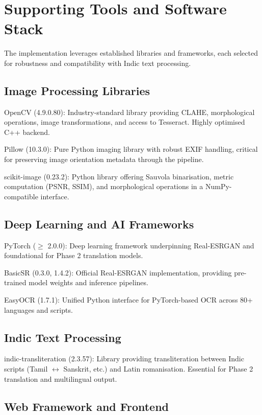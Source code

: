 \section{Supporting Tools and Software Stack}

The implementation leverages established libraries and frameworks, each selected for robustness and compatibility with Indic text processing.

\subsection{Image Processing Libraries}

OpenCV (4.9.0.80): Industry-standard library providing CLAHE, morphological operations, image transformations, and access to Tesseract. Highly optimised C++ backend.

Pillow (10.3.0): Pure Python imaging library with robust EXIF handling, critical for preserving image orientation metadata through the pipeline.

scikit-image (0.23.2): Python library offering Sauvola binarisation, metric computation (PSNR, SSIM), and morphological operations in a NumPy-compatible interface.

\subsection{Deep Learning and AI Frameworks}

PyTorch ($\geq$ 2.0.0): Deep learning framework underpinning Real-ESRGAN and foundational for Phase 2 translation models.

BasicSR (0.3.0, 1.4.2): Official Real-ESRGAN implementation, providing pre-trained model weights and inference pipelines.

EasyOCR (1.7.1): Unified Python interface for PyTorch-based OCR across 80+ languages and scripts.

\subsection{Indic Text Processing}

indic-transliteration (2.3.57): Library providing transliteration between Indic scripts (Tamil $\leftrightarrow$ Sanskrit, etc.) and Latin romanisation. Essential for Phase 2 translation and multilingual output.

\subsection{Web Framework and Frontend}

